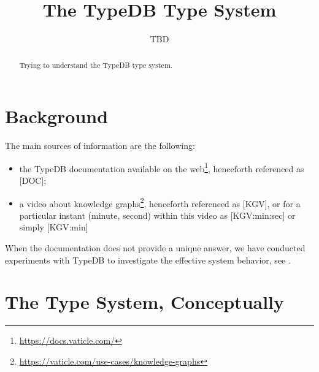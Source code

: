 \documentclass[runningheads]{llncs}
\begin{document}
\title{The TypeDB Type System}

\author{TBD
}
\maketitle

\begin{abstract}
Trying to understand the TypeDB type system.
\end{abstract}





\section{Background}\label{sec:background}

The main sources of information are the following:

\begin{itemize}
\item the TypeDB documentation available on the
  web\footnote{\url{https://docs.vaticle.com/}},
  henceforth referenced as [DOC];
\item a video about knowledge
  graphs\footnote{\url{https://vaticle.com/use-cases/knowledge-graphs}},
  henceforth referenced as [KGV], or for a particular instant (minute, second)
  within this video as [KGV:min:sec] or simply [KGV:min]
\end{itemize}

When the documentation does not
provide a unique answer, we have conducted experiments with TypeDB to
investigate the effective system behavior, see .


\section{The Type System, Conceptually}\label{sec:type_system_conceptually}
\end{document}
